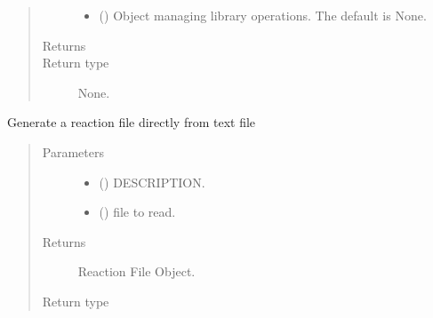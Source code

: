 \documentclass[letterpaper,10pt,english]{sphinxmanual}
\begin{document}
\begin{fulllineitems}
\begin{fulllineitems}
\begin{quote}
\begin{description}
\begin{itemize}
\item {} 
 ({\hyperref[\detokenize{api/initobjects:libmanager.LibManager}]{}}\sphinxstyleliteralemphasis{\sphinxupquote{, }}) \textendash{} Object managing library operations. The default is None.

\end{itemize}

\item[{Returns}] \leavevmode


\item[{Return type}] \leavevmode
None.

\end{description}\end{quote}

\end{fulllineitems}


\begin{fulllineitems}
\label{\detokenize{api/inputgeneration:parsersD1S.ReactionFile.from_text}}
Generate a reaction file directly from text file
\begin{quote}\begin{description}
\item[{Parameters}] \leavevmode\begin{itemize}
\item {} 
 () \textendash{} DESCRIPTION.

\item {} 
 () \textendash{} file to read.

\end{itemize}

\item[{Returns}] \leavevmode
Reaction File Object.

\item[{Return type}] \leavevmode
{\hyperref[\detokenize{api/inputgeneration:parsersD1S.ReactionFile}]{}}


\end{description}
\end{quote}
\end{fulllineitems}
\end{fulllineitems}
\end{document}
